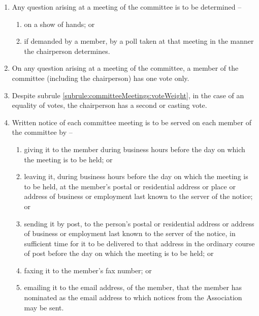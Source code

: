 \begin{enumerate}
	\item Any question arising at a meeting of the committee is to be determined --
	\begin{enumerate}
		\item on a show of hands; or
		\item if demanded by a member, by a poll taken at that meeting in the manner the chairperson determines.
	\end{enumerate}
	
	\item \label{subrule:committeeMeetings:voteWeight} On any question arising at a meeting of the committee, a member of the committee (including the chairperson) has one vote only.
	\item Despite subrule \ref{subrule:committeeMeetings:voteWeight}, in the case of an equality of votes, the chairperson has a second or casting vote.

	\item Written notice of each committee meeting is to be served on each member of the committee by --
	\begin{enumerate}
		\item giving it to the member during business hours before the day on which the meeting is to be held; or
		\item leaving it, during business hours before the day on which the meeting is to be held, at the member's postal or residential address or place or address of business or employment last known to the server of the notice; or
		\item sending it by post, to the person's postal or residential address or address of business or employment last known to the server of the notice, in sufficient time for it to be delivered to that address in the ordinary course of post before the day on which the meeting is to be held; or
		\item faxing it to the member's fax number; or
		\item emailing it to the email address, of the member, that the member has nominated as the email address to which notices from the Association may be sent.
	\end{enumerate}
\end{enumerate}